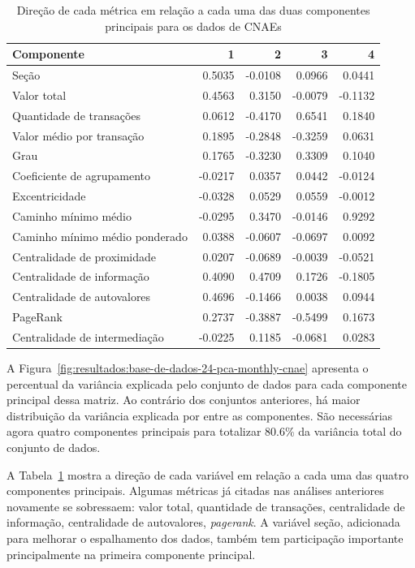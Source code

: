 \begin{table}[htb]
\centering
\caption{Direção de cada métrica em relação a cada uma das duas componentes principais para os dados de CNAEs}
\label{tab:resultados:direcao-components-cnae}
\begin{tabular}{l|rrrr}
\toprule
Componente & 1 & 2 & 3 & 4 \\
\midrule
Seção                          &  0.5035 & -0.0108 &  0.0966 &  0.0441 \\
Valor total                    &  0.4563 &  0.3150 & -0.0079 & -0.1132 \\
Quantidade de transações       &  0.0612 & -0.4170 &  0.6541 &  0.1840 \\
Valor médio por transação      &  0.1895 & -0.2848 & -0.3259 &  0.0631 \\
Grau                           &  0.1765 & -0.3230 &  0.3309 &  0.1040 \\
Coeficiente de agrupamento     & -0.0217 &  0.0357 &  0.0442 & -0.0124 \\
Excentricidade                 & -0.0328 &  0.0529 &  0.0559 & -0.0012 \\
Caminho mínimo médio           & -0.0295 &  0.3470 & -0.0146 &  0.9292 \\
Caminho mínimo médio ponderado &  0.0388 & -0.0607 & -0.0697 &  0.0092 \\
Centralidade de proximidade    &  0.0207 & -0.0689 & -0.0039 & -0.0521 \\
Centralidade de informação     &  0.4090 &  0.4709 &  0.1726 & -0.1805 \\
Centralidade de autovalores    &  0.4696 & -0.1466 &  0.0038 &  0.0944 \\
PageRank                       &  0.2737 & -0.3887 & -0.5499 &  0.1673 \\
Centralidade de intermediação  & -0.0225 &  0.1185 & -0.0681 &  0.0283 \\
\bottomrule
\end{tabular}
\fdadospesquisa
\end{table}

A Figura~\ref{fig:resultados:base-de-dados-24-pca-monthly-cnae} apresenta o percentual da variância explicada pelo conjunto de dados para cada componente principal dessa matriz. Ao contrário dos conjuntos anteriores, há maior distribuição da variância explicada por entre as componentes. São necessárias agora quatro componentes principais para totalizar 80.6\% da variância total do conjunto de dados.

A Tabela~\ref{tab:resultados:direcao-components-cnae} mostra a direção de cada variável em relação a cada uma das quatro componentes principais. Algumas métricas já citadas nas análises anteriores novamente se sobressaem: valor total, quantidade de transações, centralidade de informação, centralidade de autovalores, \textit{pagerank}. A variável seção, adicionada para melhorar o espalhamento dos dados, também tem participação importante principalmente na primeira componente principal.

